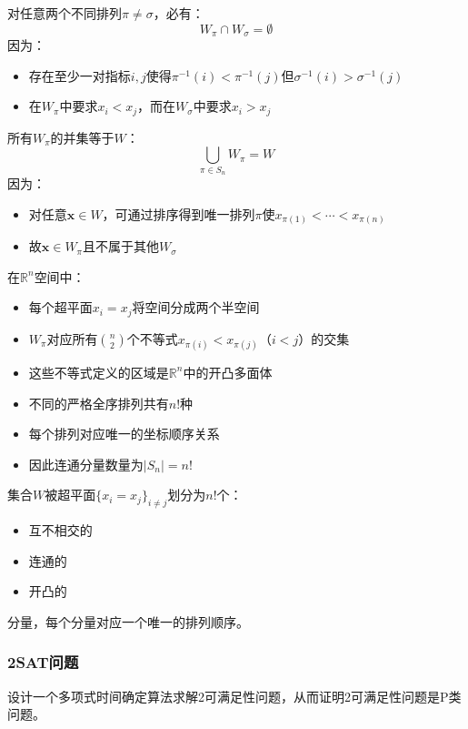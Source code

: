 \documentclass[./../main.tex]{subfiles}
\begin{document}
对任意两个不同排列$\pi \neq \sigma$，必有：
$$ W_\pi \cap W_\sigma = \emptyset $$
因为：
\begin{itemize}
    \item 存在至少一对指标$i,j$使得$\pi^{-1}(i) < \pi^{-1}(j)$但$\sigma^{-1}(i) > \sigma^{-1}(j)$
    \item 在$W_\pi$中要求$x_i < x_j$，而在$W_\sigma$中要求$x_i > x_j$
\end{itemize}

所有$W_\pi$的并集等于$W$：
$$ \bigcup_{\pi \in S_n} W_\pi = W $$
因为：
\begin{itemize}
    \item 对任意$\mathbf{x} \in W$，可通过排序得到唯一排列$\pi$使$x_{\pi(1)} < \cdots < x_{\pi(n)}$
    \item 故$\mathbf{x} \in W_\pi$且不属于其他$W_\sigma$
\end{itemize}

在$\mathbb{R}^n$空间中：
\begin{itemize}
    \item 每个超平面$x_i = x_j$将空间分成两个半空间
    \item $W_\pi$对应所有$\binom{n}{2}$个不等式$x_{\pi(i)} < x_{\pi(j)}$（$i<j$）的交集
    \item 这些不等式定义的区域是$\mathbb{R}^n$中的开凸多面体
\end{itemize}

\begin{itemize}
    \item 不同的严格全序排列共有$n!$种
    \item 每个排列对应唯一的坐标顺序关系
    \item 因此连通分量数量为$|S_n| = n!$
\end{itemize}

集合$W$被超平面$\{x_i = x_j\}_{i \neq j}$划分为$n!$个：
\begin{itemize}
    \item 互不相交的
    \item 连通的
    \item 开凸的
\end{itemize}
分量，每个分量对应一个唯一的排列顺序。

\subsubsection{2SAT问题}
设计一个多项式时间确定算法求解2可满足性问题，从而证明2可满足性问题是P类问题。
\end{document}
